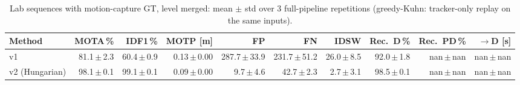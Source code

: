 \begin{table}[t]
\centering
\caption{Lab sequences with motion-capture GT, level merged: mean $\pm$ std over 3 full-pipeline repetitions (greedy-Kuhn: tracker-only replay on the same inputs).}
\label{tab:own_r9_merged_reps}
\setlength{\tabcolsep}{3pt}
\begin{tabular}{lrrrrrrrrr}
\toprule
Method & MOTA\,\% & IDF1\,\% & MOTP [m] & FP & FN & IDSW & Rec.\ D\,\% & Rec.\ PD\,\% & $\to$D [s] \\
\midrule
v1 & 81.1\,$\pm$\,2.3 & 60.4\,$\pm$\,0.9 & 0.13\,$\pm$\,0.00 & 287.7\,$\pm$\,33.9 & 231.7\,$\pm$\,51.2 & 26.0\,$\pm$\,8.5 & 92.0\,$\pm$\,1.8 & nan\,$\pm$\,nan & nan\,$\pm$\,nan \\
v2 (Hungarian) & 98.1\,$\pm$\,0.1 & 99.1\,$\pm$\,0.1 & 0.09\,$\pm$\,0.00 & 9.7\,$\pm$\,4.6 & 42.7\,$\pm$\,2.3 & 2.7\,$\pm$\,3.1 & 98.5\,$\pm$\,0.1 & nan\,$\pm$\,nan & nan\,$\pm$\,nan \\
\bottomrule
\end{tabular}
\end{table}
